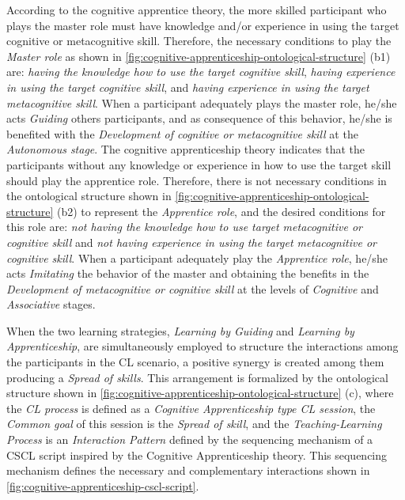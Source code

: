 According to the cognitive apprentice theory, the more skilled participant who plays the master role must have knowledge and/or experience in using the target cognitive or metacognitive skill. Therefore, the necessary conditions to play the \emph{Master role} as shown in \autoref{fig:cognitive-apprenticeship-ontological-structure} (b1) are: \emph{having the knowledge how to use the target cognitive skill}, \emph{having experience in using the target cognitive skill}, and \emph{having experience in using the target metacognitive skill}.  When a participant adequately plays the master role, he/she acts \emph{Guiding} others participants, and as consequence of this behavior, he/she is benefited with the \emph{Development of cognitive or metacognitive skill} at the \emph{Autonomous stage}. The cognitive apprenticeship theory indicates that the participants without any knowledge or experience in how to use the target skill should play the apprentice role. Therefore, there is not necessary conditions in the ontological structure shown in \autoref{fig:cognitive-apprenticeship-ontological-structure} (b2) to represent the \emph{Apprentice role}, and the desired conditions for this role are: \emph{not having the knowledge how to use target metacognitive or cognitive skill} and \emph{not having experience in using the target metacognitive or cognitive skill}. When a participant adequately play the \emph{Apprentice role}, he/she acts \emph{Imitating} the behavior of the master and obtaining the benefits in the \emph{Development of metacognitive or cognitive skill} at the levels of \emph{Cognitive} and \emph{Associative} stages.

When the two learning strategies, \emph{Learning by Guiding} and \emph{Learning by Apprenticeship}, are simultaneously employed to structure the interactions among the participants in the CL scenario, a positive synergy is created among them producing a \emph{Spread of skills}. This arrangement is formalized by the ontological structure shown in \autoref{fig:cognitive-apprenticeship-ontological-structure} (c), where the \emph{CL process} is defined as a \emph{Cognitive Apprenticeship type CL session}, the \emph{Common goal} of this session is the \emph{Spread of skill}, and the \emph{Teaching-Learning Process} is an \emph{Interaction Pattern} defined by the sequencing mechanism of a CSCL script inspired by the Cognitive Apprenticeship theory. This sequencing mechanism defines the necessary and complementary interactions shown in \autoref{fig:cognitive-apprenticeship-cscl-script}. 

